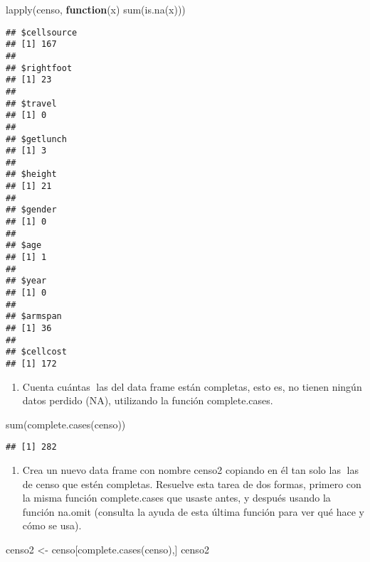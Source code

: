 \documentclass[
]{article}
\newenvironment{Shaded}{\begin{snugshade}}{\end{snugshade}}
\newcommand{\ControlFlowTok}[1]{\textcolor[rgb]{0.13,0.29,0.53}{\textbf{#1}}}
\newcommand{\FunctionTok}[1]{\textcolor[rgb]{0.00,0.00,0.00}{#1}}
\newcommand{\NormalTok}[1]{#1}
\newcommand{\OtherTok}[1]{\textcolor[rgb]{0.56,0.35,0.01}{#1}}
\providecommand{\tightlist}{%
  \setlength{\itemsep}{0pt}\setlength{\parskip}{0pt}}
\begin{document}
\begin{Shaded}
\begin{Highlighting}[]
\FunctionTok{lapply}\NormalTok{(censo, }\ControlFlowTok{function}\NormalTok{(x) }\FunctionTok{sum}\NormalTok{(}\FunctionTok{is.na}\NormalTok{(x)))}
\end{Highlighting}
\end{Shaded}

\begin{verbatim}
## $cellsource
## [1] 167
## 
## $rightfoot
## [1] 23
## 
## $travel
## [1] 0
## 
## $getlunch
## [1] 3
## 
## $height
## [1] 21
## 
## $gender
## [1] 0
## 
## $age
## [1] 1
## 
## $year
## [1] 0
## 
## $armspan
## [1] 36
## 
## $cellcost
## [1] 172
\end{verbatim}

\begin{enumerate}
\def\labelenumi{\arabic{enumi}.}
\setcounter{enumi}{3}
\tightlist
\item
  Cuenta cuántas las del data frame están completas, esto es, no tienen
  ningún datos perdido (NA), utilizando la función complete.cases.
\end{enumerate}

\begin{Shaded}
\begin{Highlighting}[]
\FunctionTok{sum}\NormalTok{(}\FunctionTok{complete.cases}\NormalTok{(censo))}
\end{Highlighting}
\end{Shaded}

\begin{verbatim}
## [1] 282
\end{verbatim}

\begin{enumerate}
\def\labelenumi{\arabic{enumi}.}
\setcounter{enumi}{4}
\tightlist
\item
  Crea un nuevo data frame con nombre censo2 copiando en él tan solo las
  las de censo que estén completas. Resuelve esta tarea de dos formas,
  primero con la misma función complete.cases que usaste antes, y
  después usando la función na.omit (consulta la ayuda de esta última
  función para ver qué hace y cómo se usa).
\end{enumerate}

\begin{Shaded}
\begin{Highlighting}[]
\NormalTok{censo2 }\OtherTok{\textless{}{-}}\NormalTok{ censo[}\FunctionTok{complete.cases}\NormalTok{(censo),]}
\NormalTok{censo2}
\end{Highlighting}
\end{Shaded}
\end{document}
